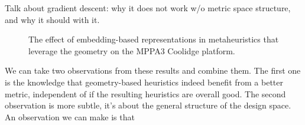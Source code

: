 Talk about gradient descent: why it does not work w/o metric space structure, and why it should with it.
\begin{figure}[h]
	\centering
   \resizebox{0.95\textwidth}{!}{}
	\caption{The effect of embedding-based representations in metaheuristics that leverage the geometry on the MPPA3 Coolidge platform.}
	\label{fig:coolidge_geometric}
\end{figure}

We can take two observations from these results and combine them.
The first one is the knowledge that geometry-based heuristics indeed benefit from a better metric, independent of if the resulting heuristics are overall good.
The second observation is more subtle, it's about the general structure of the design space. 
An observation we can make is that 

